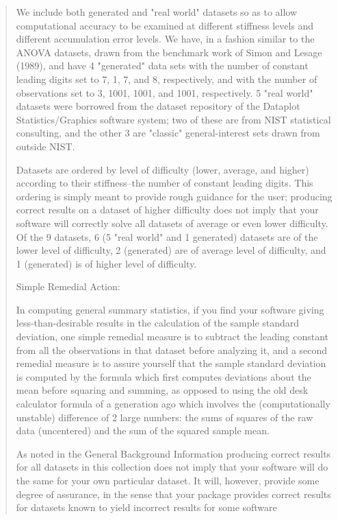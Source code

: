 \documentclass[10pt]{article}
\begin{document}
\begin{quote}
We include both generated and "real world" datasets so as to allow computational accuracy to be examined at different stiffness levels and different accumulation error levels. We have, in a fashion similar to the ANOVA datasets, drawn from the benchmark work of Simon and Lesage (1989), and have 4 "generated" data sets with the number of constant leading digits set to 7, 1, 7, and 8, respectively, and with the number of observations set to 3, 1001, 1001, and 1001, respectively. 5 "real world" datasets were borrowed from the dataset repository of the Dataplot Statistics/Graphics software system; two of these are from NIST statistical consulting, and the other 3 are "classic" general-interest sets drawn from outside NIST. 

Datasets are ordered by level of difficulty (lower, average, and higher) according to their stiffness--the number of constant leading digits. This ordering is simply meant to provide rough guidance for the user; producing correct results on a dataset of higher difficulty does not imply that your software will correctly solve all datasets of average or even lower difficulty. Of the 9 datasets, 6 (5 "real world" and 1 generated) datasets are of the lower level of difficulty, 2 (generated) are of average level of difficulty, and 1 (generated) is of higher level of difficulty. 

Simple Remedial Action:

In computing general summary statistics, if you find your software giving less-than-desirable results in the calculation of the sample standard deviation, one simple remedial measure is to subtract the leading constant from all the observations in that dataset before analyzing it, and a second remedial measure is to assure yourself that the sample standard deviation is computed by the formula which first computes deviations about the mean before squaring and summing, as opposed to using the old desk calculator formula of a generation ago which involves the (computationally unstable) difference of 2 large numbers: the sums of squares of the raw data (uncentered) and the sum of the squared sample mean. 

As noted in the  General Background Information producing correct results for all datasets in this collection does not imply that your software will do the same for your own particular dataset. It will, however, provide some degree of assurance, in the sense that your package provides correct results for datasets known to yield incorrect results for some software
\end{quote}
\end{document}
